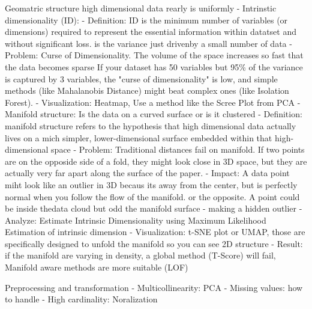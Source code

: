     Geomatric structure
        high dimensional data rearly is uniformly
        - Intrinstic dimensionality (ID): 
            - Definition: ID is the minimum number of variables (or dimensions) required to represent the essential information within datatset and without significant loss.
                is the variance just drivenby a small number of data
            - Problem: Curse of Dimensionality. The volume of the space increases so fast that the data becomes sparse
                If your dataset has 50 variables but 95\% of the variance is captured by 3 variables, the "curse of dimensionality" is low, and simple methods (like Mahalanobis Distance) might beat complex ones (like Isolation Forest).
            - Visualization: Heatmap, Use a method like the Scree Plot from PCA
        - Manifold structure: Is the data on a curved surface or is it clustered
            - Definition: manifold structure refers to the hypothesis that high dimensional data actually lives on a mich simpler, lower-dimensional surface embedded within that high-dimensional space
            - Problem: Traditional distances fail on manifold. If two points are on the opposide side of a fold, they might look close in 3D space, but they are actually very far apart along the surface of the paper.
            - Impact: A data point miht look like an outlier in 3D becaus its away from the center, but is perfectly normal when you follow the flow of the manifold. 
                or the opposite. A point could be inside thedata cloud but odd the manifold surface - making a hidden outlier
            - Analyze: Estimate Intrinsic Dimensionality using Maximum Likelihood Estimation of intrinsic dimension
            - Visualization: t-SNE plot or UMAP, those are specifically designed to unfold the manifold so you can see 2D structure 
            - Result: if the manifold are varying in density, a global method (T-Score) will fail, Manifold aware methods are more suitable (LOF) 
            
            
    Preprocessing and transformation
        - Multicollinearity: PCA
        - Missing values: how to handle
        - High cardinality: Noralization

